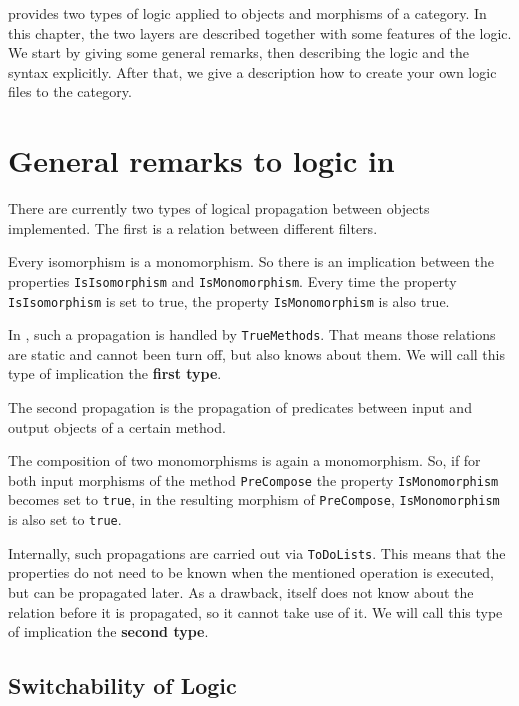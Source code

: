 \CapPkg provides two types of logic applied to objects and morphisms of a category.
In this chapter, the two layers are described together with some features of the logic.
We start by giving some general remarks, then describing the logic and the syntax explicitly.
After that, we give a description how to create your own logic files to the category.

\section{General remarks to logic in \CapPkg}

There are currently two types of logical propagation between \GAP objects implemented.
The first is a relation between different filters.

\begin{example}
 Every isomorphism is a monomorphism. So there is an implication between the properties
 \texttt{IsIsomorphism} and \texttt{IsMonomorphism}. Every time the property \texttt{IsIsomorphism}
 is set to true, the property \texttt{IsMonomorphism} is also true.
\end{example}

In \CapPkg, such a propagation is handled by \texttt{TrueMethods}. That means those relations
are static and cannot been turn off, but also \GAP knows about them. We will call this type of
implication the \textbf{first type}.

The second propagation is the propagation of predicates between input and output objects
of a certain method.

\begin{example}
  The composition of two monomorphisms is again a monomorphism. So, if for both input morphisms
  of the method \texttt{PreCompose} the property \texttt{IsMonomorphism} becomes set to \texttt{true},
  in the resulting morphism of \texttt{PreCompose}, \texttt{IsMonomorphism} is also set to \texttt{true}.
\end{example}

Internally, such propagations are carried out via \texttt{ToDoLists}. This means that the properties
do not need to be known when the mentioned operation is executed, but can be propagated later. As a drawback,
\GAP itself does not know about the relation before it is propagated, so it cannot take use of it. We will
call this type of implication the \textbf{second type}.

\subsection{Switchability of Logic}

